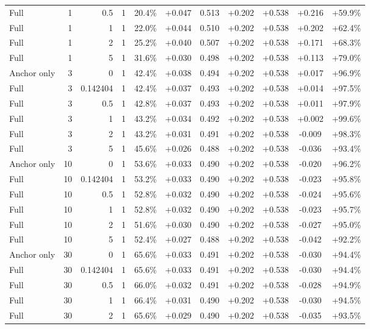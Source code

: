 \begin{table}[htbp]
\begin{tabular}{lrrrccccccc}
Full & 1 & 0.5 & 1 & 20.4\% & +0.047 & 0.513 & +0.202 & +0.538 & +0.216 & +59.9\% \\
Full & 1 & 1 & 1 & 22.0\% & +0.044 & 0.510 & +0.202 & +0.538 & +0.202 & +62.4\% \\
Full & 1 & 2 & 1 & 25.2\% & +0.040 & 0.507 & +0.202 & +0.538 & +0.171 & +68.3\% \\
Full & 1 & 5 & 1 & 31.6\% & +0.030 & 0.498 & +0.202 & +0.538 & +0.113 & +79.0\% \\
Anchor only & 3 & 0 & 1 & 42.4\% & +0.038 & 0.494 & +0.202 & +0.538 & +0.017 & +96.9\% \\
Full & 3 & 0.142404 & 1 & 42.4\% & +0.037 & 0.493 & +0.202 & +0.538 & +0.014 & +97.5\% \\
Full & 3 & 0.5 & 1 & 42.8\% & +0.037 & 0.493 & +0.202 & +0.538 & +0.011 & +97.9\% \\
Full & 3 & 1 & 1 & 43.2\% & +0.034 & 0.492 & +0.202 & +0.538 & +0.002 & +99.6\% \\
Full & 3 & 2 & 1 & 43.2\% & +0.031 & 0.491 & +0.202 & +0.538 & -0.009 & +98.3\% \\
Full & 3 & 5 & 1 & 45.6\% & +0.026 & 0.488 & +0.202 & +0.538 & -0.036 & +93.4\% \\
Anchor only & 10 & 0 & 1 & 53.6\% & +0.033 & 0.490 & +0.202 & +0.538 & -0.020 & +96.2\% \\
Full & 10 & 0.142404 & 1 & 53.2\% & +0.033 & 0.490 & +0.202 & +0.538 & -0.023 & +95.8\% \\
Full & 10 & 0.5 & 1 & 52.8\% & +0.032 & 0.490 & +0.202 & +0.538 & -0.024 & +95.6\% \\
Full & 10 & 1 & 1 & 52.8\% & +0.032 & 0.490 & +0.202 & +0.538 & -0.023 & +95.7\% \\
Full & 10 & 2 & 1 & 51.6\% & +0.030 & 0.490 & +0.202 & +0.538 & -0.027 & +95.0\% \\
Full & 10 & 5 & 1 & 52.4\% & +0.027 & 0.488 & +0.202 & +0.538 & -0.042 & +92.2\% \\
Anchor only & 30 & 0 & 1 & 65.6\% & +0.033 & 0.491 & +0.202 & +0.538 & -0.030 & +94.4\% \\
Full & 30 & 0.142404 & 1 & 65.6\% & +0.033 & 0.491 & +0.202 & +0.538 & -0.030 & +94.4\% \\
Full & 30 & 0.5 & 1 & 66.0\% & +0.032 & 0.491 & +0.202 & +0.538 & -0.028 & +94.9\% \\
Full & 30 & 1 & 1 & 66.4\% & +0.031 & 0.490 & +0.202 & +0.538 & -0.030 & +94.5\% \\
Full & 30 & 2 & 1 & 65.6\% & +0.029 & 0.490 & +0.202 & +0.538 & -0.035 & +93.5\% \\

\end{tabular}
\end{table}
